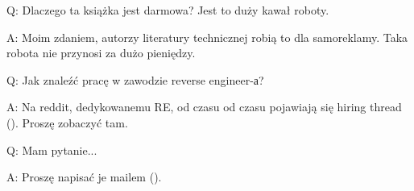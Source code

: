 \par Q: Dlaczego ta książka jest darmowa? Jest to duży kawał roboty.
\par A: Moim zdaniem, autorzy literatury technicznej robią to dla samoreklamy. Taka robota nie przynosi za dużo pieniędzy.

\par Q: Jak znaleźć pracę w zawodzie reverse engineer-а?
\par A: Na reddit, dedykowanemu RE\FNURLREDDIT, od czasu od czasu pojawiają się hiring thread (\RedditHiringThread{}).
Proszę zobaczyć tam.


\par Q: Mam pytanie...
\par A: Proszę napisać je mailem (\EMAIL).

